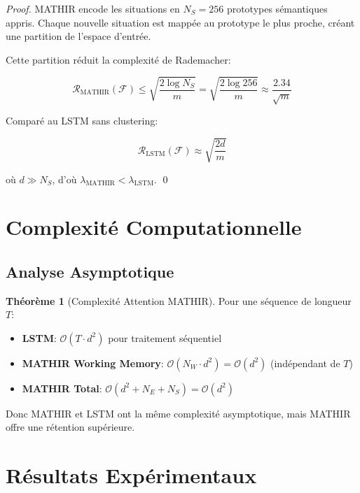 \documentclass[12pt]{article}
\theoremstyle{definition}
\newtheorem{theorem}{Théorème}
\begin{document}
\begin{proof}
MATHIR encode les situations en $N_S = 256$ prototypes sémantiques appris.
Chaque nouvelle situation est mappée au prototype le plus proche, créant 
une partition de l'espace d'entrée.

Cette partition réduit la complexité de Rademacher:

\begin{equation}
\mathcal{R}_{\text{MATHIR}}(\mathcal{F}) \leq 
\sqrt{\frac{2 \log N_S}{m}} = \sqrt{\frac{2 \log 256}{m}} \approx \frac{2.34}{\sqrt{m}}
\end{equation}

Comparé au LSTM sans clustering:

\begin{equation}
\mathcal{R}_{\text{LSTM}}(\mathcal{F}) \approx \sqrt{\frac{2 d}{m}}
\end{equation}

où $d \gg N_S$, d'où $\lambda_{\text{MATHIR}} < \lambda_{\text{LSTM}}$. \qed
\end{proof}

\section{Complexité Computationnelle}

\subsection{Analyse Asymptotique}

\begin{theorem}[Complexité Attention MATHIR]
Pour une séquence de longueur $T$:

\begin{itemize}
\item \textbf{LSTM}: $\mathcal{O}(T \cdot d^2)$ pour traitement séquentiel
\item \textbf{MATHIR Working Memory}: $\mathcal{O}(N_W \cdot d^2) = \mathcal{O}(d^2)$ (indépendant de $T$)
\item \textbf{MATHIR Total}: $\mathcal{O}(d^2 + N_E + N_S) = \mathcal{O}(d^2)$
\end{itemize}

Donc MATHIR et LSTM ont la même complexité asymptotique, mais MATHIR offre 
une rétention supérieure.
\end{theorem}

\section{Résultats Expérimentaux}
\end{document}
